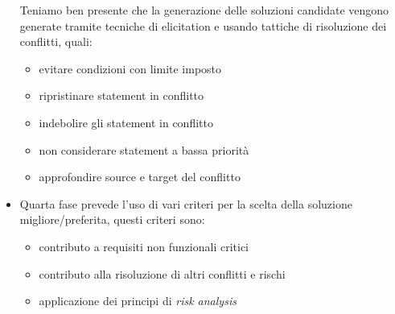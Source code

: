 \begin{itemize}
\begin{itemize}
        \end{itemize}
    Teniamo ben presente che la generazione delle soluzioni candidate vengono generate tramite tecniche di elicitation e usando tattiche di risoluzione dei conflitti, quali:
        \begin{itemize}
          \item evitare condizioni con limite imposto 
          \item ripristinare statement in conflitto
          \item indebolire gli statement in conflitto
          \item non considerare statement a bassa priorità
          \item approfondire source e target del conflitto
        \end{itemize}
     \item Quarta fase prevede l'uso di vari criteri per la scelta della soluzione migliore/preferita, questi criteri sono:
        \begin{itemize}
            \item contributo a requisiti non funzionali critici 
            \item contributo alla risoluzione di altri conflitti e rischi 
            \item applicazione dei principi di \textit{risk analysis}
        \end{itemize}
\end{itemize}
